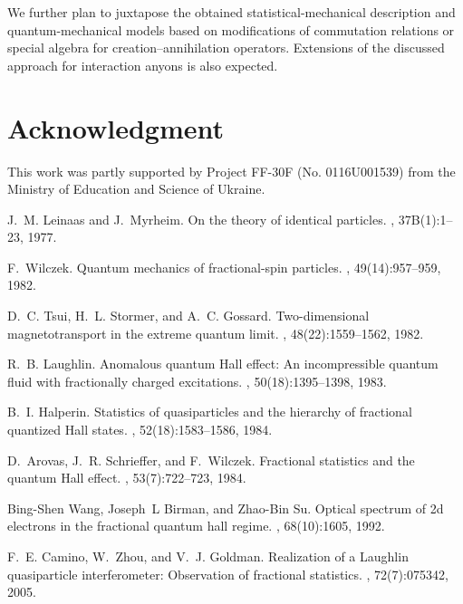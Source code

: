 \documentclass[12pt,a4paper]{article}
\begin{document}
{We further plan to juxtapose the obtained statistical-mechanical  description and quantum-mechanical models based on modifications of commutation relations or special algebra for creation--annihilation operators. Extensions of the discussed approach for interaction anyons is also expected.


\section*{Acknowledgment}
This work was partly supported by Project FF-30F (No. 0116U001539) from the Ministry of Education and Science of Ukraine.

\begin{thebibliography}{10}

J.~M. Leinaas and J.~Myrheim.
\newblock On the theory of identical particles.
, 37B(1):1--23, 1977.

F.~Wilczek.
\newblock Quantum mechanics of fractional-spin particles.
, 49(14):957--959, 1982.

D.~C. Tsui, H.~L. Stormer, and A.~C. Gossard.
\newblock Two-dimensional magnetotransport in the extreme quantum limit.
, 48(22):1559--1562, 1982.

R.~B. Laughlin.
\newblock Anomalous quantum {H}all effect: {A}n incompressible quantum fluid
  with fractionally charged excitations.
, 50(18):1395--1398, 1983.

B.~I. Halperin.
\newblock Statistics of quasiparticles and the hierarchy of fractional
  quantized {H}all states.
, 52(18):1583--1586, 1984.

D.~Arovas, J.~R. Schrieffer, and F.~Wilczek.
\newblock Fractional statistics and the quantum {H}all effect.
, 53(7):722--723, 1984.

Bing-Shen Wang, Joseph~L Birman, and Zhao-Bin Su.
\newblock Optical spectrum of 2d electrons in the fractional quantum hall
  regime.
, 68(10):1605, 1992.

F.~E. Camino, W.~Zhou, and V.~J. Goldman.
\newblock Realization of a {L}aughlin quasiparticle interferometer:
  {O}bservation of fractional statistics.
, 72(7):075342, 2005.


\end{thebibliography}}
\end{document}
